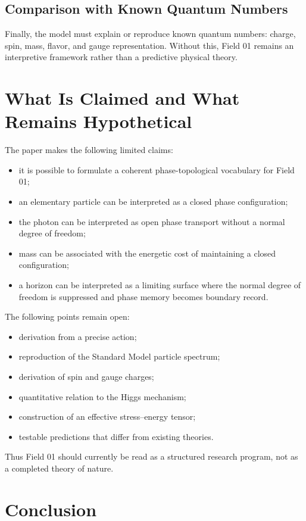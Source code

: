 \documentclass[11pt,a4paper]{article}
\begin{document}
\subsection*{Comparison with Known Quantum Numbers}

Finally, the model must explain or reproduce known quantum numbers: charge, spin, mass, flavor, and gauge representation. Without this, Field 01 remains an interpretive framework rather than a predictive physical theory.

\section{What Is Claimed and What Remains Hypothetical}

The paper makes the following limited claims:
\begin{itemize}
\item it is possible to formulate a coherent phase-topological vocabulary for Field 01;
\item an elementary particle can be interpreted as a closed phase configuration;
\item the photon can be interpreted as open phase transport without a normal degree of freedom;
\item mass can be associated with the energetic cost of maintaining a closed configuration;
\item a horizon can be interpreted as a limiting surface where the normal degree of freedom is suppressed and phase memory becomes boundary record.
\end{itemize}

The following points remain open:
\begin{itemize}
\item derivation from a precise action;
\item reproduction of the Standard Model particle spectrum;
\item derivation of spin and gauge charges;
\item quantitative relation to the Higgs mechanism;
\item construction of an effective stress--energy tensor;
\item testable predictions that differ from existing theories.
\end{itemize}

Thus Field 01 should currently be read as a structured research program, not as a completed theory of nature.

\section{Conclusion}
\end{document}
